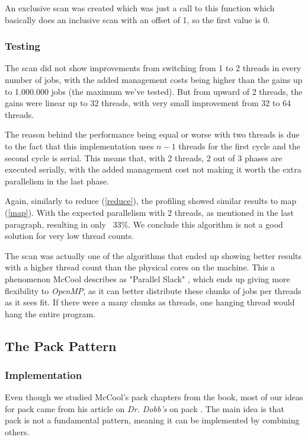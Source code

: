 \documentclass[9pt,journal]{IEEEtran}
\begin{document}
An exclusive scan was created which was just a call to this function which basically does an inclusive scan with an offset of 1, so the first value is 0.

\subsubsection{Testing}

The scan did not show improvements from switching from 1 to 2 threads in every number of jobs, with the added management costs being higher than the gains up to 1.000.000 jobs (the maximum we've tested). But from upward of 2 threads, the gains were linear up to 32 threads, with very small improvement from 32 to 64 threads. 

The reason behind the performance being equal or worse with two threads is due to the fact that this implementation uses $ n - 1 $ threads for the first cycle and the second cycle is serial. This means that, with 2 threads, 2 out of 3 phases are executed serially, with the added management cost not making it worth the extra parallelism in the last phase.

Again, similarly to reduce (\ref{reduce}), the profiling showed similar results to map (\ref{map}). With the expected parallelism with 2 threads, as mentioned in the last paragraph, resulting in only ~33\%. We conclude this algorithm is not a good solution for very low thread counts.

The scan was actually one of the algorithms that ended up showing better results with a higher thread count than the physical cores on the machine. This a phenomenon McCool describes as "Parallel Slack" \cite{mccool}, which ends up giving more flexibility to \textit{OpenMP}, as it can better distribute these chunks of jobs per threads as it sees fit. If there were a many chunks as threads, one hanging thread would hang the entire program.

\subsection{The Pack Pattern}
\subsubsection{Implementation}
\label{pack}

Even though we studied McCool's pack chapters from the book, most of our ideas for pack came from his article on \textit{Dr. Dobb's} on pack \cite{dobbpack}. The main idea is that pack is not a fundamental pattern, meaning it can be implemented by combining others. 
\end{document}
